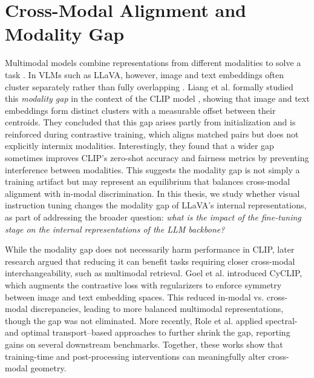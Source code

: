 \section{Cross-Modal Alignment and Modality Gap}

Multimodal models combine representations from different modalities to solve a task \cite{liSurveyStateArt2025}. In VLMs such as LLaVA, however, image and text embeddings often cluster separately rather than fully overlapping \cite{liangMindGapUnderstanding2022, roleFillGapQuantifying2025}. Liang et al. \cite{liangMindGapUnderstanding2022} formally studied this \emph{modality gap} in the context of the CLIP model \cite{radfordLearningTransferableVisual2021}, showing that image and text embeddings form distinct clusters with a measurable offset between their centroids. They concluded that this gap arises partly from initialization and is reinforced during contrastive training, which aligns matched pairs but does not explicitly intermix modalities. Interestingly, they found that a wider gap sometimes improves CLIP's zero-shot accuracy and fairness metrics by preventing interference between modalities. This suggests the modality gap is not simply a training artifact but may represent an equilibrium that balances cross-modal alignment with in-modal discrimination. In this thesis, we study whether visual instruction tuning changes the modality gap of LLaVA's internal representations, as part of addressing the broader question: \emph{what is the impact of the fine-tuning stage on the internal representations of the LLM backbone?}

While the modality gap does not necessarily harm performance in CLIP, later research argued that reducing it can benefit tasks requiring closer cross-modal interchangeability, such as multimodal retrieval. Goel et al. \cite{goelCyCLIPCyclicContrastive2022} introduced CyCLIP, which augments the contrastive loss with regularizers to enforce symmetry between image and text embedding spaces. This reduced in-modal vs. cross-modal discrepancies, leading to more balanced multimodal representations, though the gap was not eliminated. More recently, Role et al. \cite{roleFillGapQuantifying2025} applied spectral- and optimal transport–based approaches to further shrink the gap, reporting gains on several downstream benchmarks. Together, these works show that training-time and post-processing interventions can meaningfully alter cross-modal geometry. 
